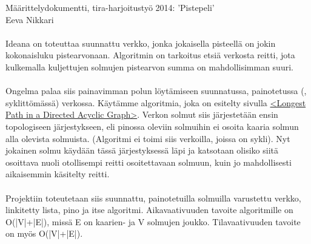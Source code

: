 \documentclass[12pt,a4paper,leqno]{amsart}
\begin{document}
Määrittelydokumentti, tira-harjoitustyö 2014: 'Pistepeli'\\

Eeva Nikkari\\\\
				
Ideana on toteuttaa suunnattu verkko, jonka jokaisella pisteellä on jokin kokonaisluku pistearvonaan. Algoritmin on tarkoitus etsiä verkosta reitti, jota kulkemalla kuljettujen solmujen pistearvon summa on mahdollisimman suuri.\\\\

Ongelma palaa siis painavimman polun löytämiseen suunnatussa, painotetussa (, syklittömässä) verkossa. Käytämme algoritmia, joka on esitelty sivulla \href{http://www.geeksforgeeks.org/find-longest-path-directed-acyclic-graph/}{<Longest Path in a Directed Acyclic Graph>}. Verkon solmut siis järjestetään ensin topologiseen järjestykseen, eli pinossa oleviin solmuihin ei osoita kaaria solmun alla olevista solmuista. (Algoritmi ei toimi siis verkoilla, joissa on sykli). Nyt jokainen solmu käydään tässä järjestyksessä läpi ja katsotaan olisiko siitä osoittava nuoli otollisempi reitti osoitettavaan solmuun, kuin jo mahdollisesti aikaisemmin käsitelty reitti.\\\\

Projektiin toteutetaan siis suunnattu, painotetuilla solmuilla varustettu verkko, linkitetty lista, pino ja itse algoritmi.
Aikavaativuuden tavoite algoritmille on O(|V|+|E|), missä E on kaarien- ja V solmujen joukko. Tilavaativuuden tavoite on myös O(|V|+|E|).
\end{document}
